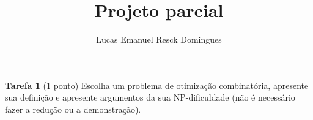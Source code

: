 \documentclass{article}
\title{Projeto parcial}
\author{Lucas Emanuel Resck Domingues}
\begin{document}
    \maketitle
    
    \noindent \textbf{Tarefa 1} (1 ponto) Escolha um problema de otimização combinatória, apresente sua definição e apresente argumentos da sua NP-dificuldade (não é necessário fazer a redução ou a demonstração).

    \bigskip

    
\end{document}
